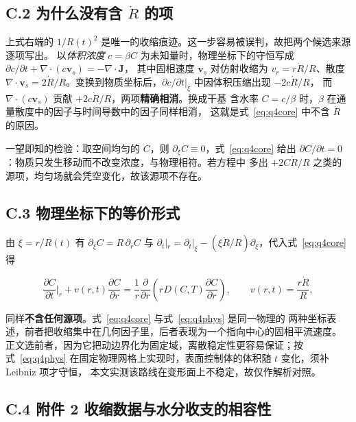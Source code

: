 \documentclass[withoutpreface,bwprint]{cumcmthesis} %
\begin{document}
\begin{appendices}
\subsection*{C.2 为什么没有含 $\dot R$ 的项}

上式右端的 $1/R(t)^2$ 是唯一的收缩痕迹。这一步容易被误判，故把两个候选来源逐项写出。
以\emph{体积浓度} $c=\beta C$ 为未知量时，物理坐标下的守恒写成
$\partial c/\partial t+\nabla\!\cdot\!(c\mathbf v_s)=-\nabla\!\cdot\!\mathbf J$，
其中固相速度 $\mathbf v_s$ 对仿射收缩为 $v_r=r\dot R/R$、散度 $\nabla\!\cdot\!\mathbf v_s
=2\dot R/R$。变换到物质坐标后，$\partial c/\partial t|_\xi$ 中因体积压缩出现 $-2c\dot R/R$，
而 $\nabla\!\cdot\!(c\mathbf v_s)$ 贡献 $+2c\dot R/R$，两项\textbf{精确相消}。换成干基
含水率 $C=c/\beta$ 时，$\beta$ 在通量散度中的因子与时间导数中的因子同样相消，
这就是式~\eqref{eq:q4core} 中不含 $\dot R$ 的原因。

一望即知的检验：取空间均匀的 $C$，则 $\partial_\xi C\equiv0$，式~\eqref{eq:q4core}
给出 $\partial C/\partial t=0$：物质只发生移动而不改变浓度，与物理相符。若方程中
多出 $+2C\dot R/R$ 之类的源项，均匀场就会凭空变化，故该源项不存在。

\subsection*{C.3 物理坐标下的等价形式}

由 $\xi=r/R(t)$ 有 $\partial_\xi C=R\,\partial_rC$ 与
$\partial_t|_r=\partial_t|_\xi-(\xi\dot R/R)\partial_\xi$，代入式~\eqref{eq:q4core} 得

\begin{equation}
\label{eq:q4phys}
\frac{\partial C}{\partial t}\Big|_{r}+v(r,t)\frac{\partial C}{\partial r}
=\frac{1}{r}\frac{\partial}{\partial r}\left(rD(C,T)\frac{\partial C}{\partial r}\right),
\qquad v(r,t)=\frac{r\dot R}{R},
\end{equation}

同样\textbf{不含任何源项}。式~\eqref{eq:q4core} 与式~\eqref{eq:q4phys} 是同一物理的
两种坐标表述，前者把收缩集中在几何因子里，后者表现为一个指向中心的固相平流速度。
正文选前者，因为它把动边界化为固定域，离散稳定性更容易保证；按式~\eqref{eq:q4phys}
在固定物理网格上实现时，表面控制体的体积随 $t$ 变化，须补 Leibniz 项才守恒，
本文实测该路线在变形面上不稳定，故仅作解析对照。

\subsection*{C.4 附件 2 收缩数据与水分收支的相容性}


\end{appendices}
\end{document}
